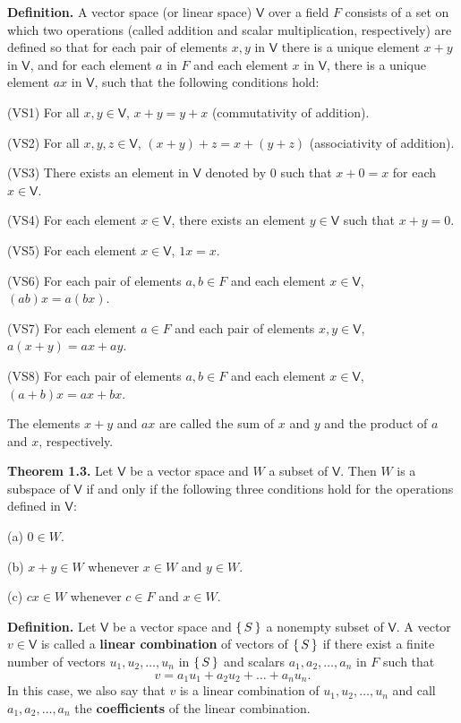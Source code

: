 \documentclass{article}
\newcommand{\0}{\mathit{0}}
\begin{document}
\textbf{Definition.}
A vector space (or linear space) $\mathsf{V}$ over a field $F$ consists of
a set on which two operations (called addition and scalar multiplication,
respectively) are defined so that for each pair of elements $x, y$ in
$\mathsf{V}$ there is a unique element $x + y$ in $\mathsf{V}$, and for
each element $a$ in $F$ and each element $x$ in $\mathsf{V}$, there is a
unique element $ax$ in $\mathsf{V}$, such that the following conditions hold:

(VS1) For all $x, y \in \mathsf{V}$, $x + y = y + x$ (commutativity of addition).

(VS2) For all $x, y, z \in \mathsf{V}$, $(x + y) + z = x + (y + z)$
(associativity of addition).

(VS3) There exists an element in $\mathsf{V}$ denoted by $\0$ such that
$x + \0 = x$ for each $x \in \mathsf{V}$.

(VS4) For each element $x \in \mathsf{V}$, there exists an element
$y \in \mathsf{V}$ such that $x + y = \0$.

(VS5) For each element $x \in \mathsf{V}$, $1x = x$.

(VS6) For each pair of elements $a, b \in F$ and each element
$x \in \mathsf{V}$, $(ab)x = a(bx)$.

(VS7) For each element $a \in F$ and each pair of elements
$x, y \in \mathsf{V}$, $a(x + y) = ax + ay$.

(VS8) For each pair of elements $a, b \in F$ and each element
$x \in \mathsf{V}$, $(a + b)x = ax + bx$.

The elements $x + y$ and $ax$ are called the sum of $x$ and $y$ and the
product of $a$ and $x$, respectively.

\medskip

\textbf{Theorem 1.3.}
Let $\mathsf{V}$ be a vector space and $W$ a subset of
$\mathsf{V}$. Then $W$ is a subspace of $\mathsf{V}$ if and
only if the following three conditions hold for the operations
defined in $\mathsf{V}$:

(a) $\0 \in W$.

(b) $x + y \in W$ whenever $x \in W$ and $y \in W$.

(c) $c x \in W$ whenever $c \in F$ and $x \in W$.

\medskip

\textbf{Definition.}
Let $\mathsf{V}$ be a vector space and $\set{S}$ a nonempty subset of
$\mathsf{V}$. A vector $v \in \mathsf{V}$ is called a \textbf{linear combination}
of vectors of $\set{S}$ if there exist a finite number of vectors
$u_1, u_2, \dots, u_n$ in $\set{S}$ and scalars $a_1, a_2, \dots, a_n$
in $F$ such that
\[
    v = a_1 u_1 + a_2 u_2 + \dots + a_n u_n.
\]
In this case, we also say that $v$ is a linear combination of
$u_1, u_2, \dots, u_n$ and call $a_1, a_2, \dots, a_n$ the \textbf{coefficients}
of the linear combination.
\end{document}
